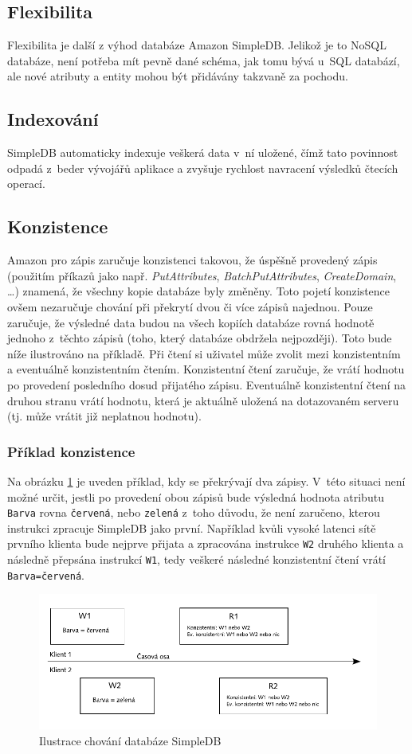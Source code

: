 \documentclass[oneside,12pt]{fithesis2}
\begin{document}
\subsection{Flexibilita}
Flexibilita je další z výhod databáze Amazon SimpleDB. Jelikož je to NoSQL databáze, není potřeba mít pevně dané schéma, jak tomu bývá u~SQL databází, ale nové atributy a entity mohou být přidávány takzvaně za pochodu.
\subsection{Indexování}
SimpleDB automaticky indexuje veškerá data v~ní uložené, čímž tato povinnost odpadá z~beder vývojářů aplikace a zvyšuje rychlost navracení výsledků čtecích operací.	
\subsection{Konzistence}
Amazon pro zápis zaručuje konzistenci takovou, že úspěšně provedený zápis (použitím příkazů jako např. \emph{PutAttributes}, \emph{BatchPutAttributes}, \emph{CreateDomain}, \dots) znamená, že všechny kopie databáze byly změněny. Toto pojetí konzistence ovšem nezaručuje chování při překrytí dvou či více zápisů najednou. Pouze zaručuje, že výsledné data budou na všech kopiích databáze rovná hodnotě jednoho z~těchto zápisů (toho, který databáze obdržela nejpozději). Toto bude níže ilustrováno na příkladě.
Při čtení si uživatel může zvolit mezi konzistentním a eventuálně konzistentním čtením. Konzistentní čtení zaručuje, že vrátí hodnotu po provedení posledního dosud přijatého zápisu. Eventuálně konzistentní čtení na druhou stranu vrátí hodnotu, která je aktuálně uložená na dotazovaném serveru (tj. může vrátit již neplatnou hodnotu).
\subsubsection*{Příklad konzistence}
Na obrázku \ref{consistencyExample} je uveden příklad, kdy se překrývají dva zápisy. V~této situaci není možné určit, jestli po provedení obou zápisů bude výsledná hodnota atributu \verb<Barva< rovna \verb<červená<, nebo \verb<zelená< z~toho důvodu, že není zaručeno, kterou instrukci zpracuje SimpleDB jako první. Například kvůli vysoké latenci sítě prvního klienta bude nejprve přijata a zpracována instrukce \verb<W2< druhého klienta a následně přepsána instrukcí \verb<W1<, tedy veškeré následné konzistentní čtení vrátí \verb<Barva=červená<.
\begin{figure}[h]
 \centering
 \includegraphics[scale=0.9]{ConsistencyExample}
 \caption{Ilustrace chování databáze SimpleDB}
 \label{consistencyExample}
\end{figure}
\end{document}
